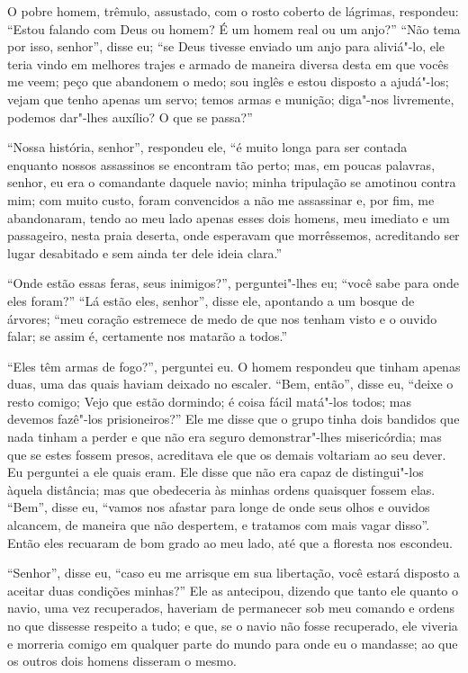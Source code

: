 O pobre homem, trêmulo, assustado, com o rosto coberto de lágrimas,
respondeu: ``Estou falando com Deus ou homem? É um homem real ou um
anjo?'' ``Não tema por isso, senhor'', disse eu; ``se Deus tivesse
enviado um anjo para aliviá"-lo, ele teria vindo em melhores trajes e
armado de maneira diversa desta em que vocês me veem; peço que abandonem
o medo; sou inglês e estou disposto a ajudá"-los; vejam que tenho apenas
um servo; temos armas e munição; diga"-nos livremente, podemos dar"-lhes
auxílio? O que se passa?''

``Nossa história, senhor'', respondeu ele, ``é muito longa para ser
contada enquanto nossos assassinos se encontram tão perto; mas, em
poucas palavras, senhor, eu era o comandante daquele navio; minha
tripulação se amotinou contra mim; com muito custo, foram convencidos a
não me assassinar e, por fim, me abandonaram, tendo ao meu lado apenas
esses dois homens, meu imediato e um passageiro, nesta praia deserta,
onde esperavam que morrêssemos, acreditando ser lugar desabitado e sem
ainda ter dele ideia clara.''

``Onde estão essas feras, seus inimigos?'', perguntei"-lhes eu; ``você
sabe para onde eles foram?'' ``Lá estão eles, senhor'', disse ele,
apontando a um bosque de árvores; ``meu coração estremece de medo de que
nos tenham visto e o ouvido falar; se assim é, certamente nos matarão a
todos.''

``Eles têm armas de fogo?'', perguntei eu. O homem respondeu que tinham
apenas duas, uma das quais haviam deixado no escaler. ``Bem, então'',
disse eu, ``deixe o resto comigo; Vejo que estão dormindo; é coisa fácil
matá"-los todos; mas devemos fazê"-los prisioneiros?'' Ele me disse que o
grupo tinha dois bandidos que nada tinham a perder e que não era seguro
demonstrar"-lhes misericórdia; mas que se estes fossem presos, acreditava
ele que os demais voltariam ao seu dever. Eu perguntei a ele quais eram.
Ele disse que não era capaz de distingui"-los àquela distância; mas que
obedeceria às minhas ordens quaisquer fossem elas. ``Bem'', disse eu,
``vamos nos afastar para longe de onde seus olhos e ouvidos alcancem, de
maneira que não despertem, e tratamos com mais vagar disso''. Então eles
recuaram de bom grado ao meu lado, até que a floresta nos escondeu.

``Senhor'', disse eu, ``caso eu me arrisque em sua libertação, você
estará disposto a aceitar duas condições minhas?'' Ele as antecipou,
dizendo que tanto ele quanto o navio, uma vez recuperados, haveriam de
permanecer sob meu comando e ordens no que dissesse respeito a tudo; e
que, se o navio não fosse recuperado, ele viveria e morreria comigo em
qualquer parte do mundo para onde eu o mandasse; ao que os outros dois
homens disseram o mesmo.

